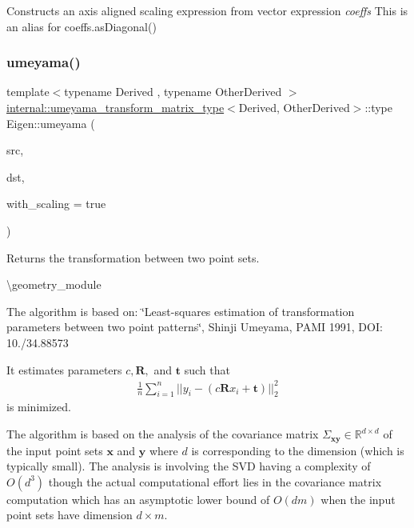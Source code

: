 Constructs an axis aligned scaling expression from vector expression {\itshape coeffs} This is an alias for coeffs.\+as\+Diagonal() \mbox{\label{group___geometry___module_gab3f5a82a24490b936f8694cf8fef8e60}} 
\subsubsection{\texorpdfstring{umeyama()}{umeyama()}}
{\footnotesize\ttfamily template$<$typename Derived , typename Other\+Derived $>$ \\
\mbox{\hyperlink{struct_eigen_1_1internal_1_1umeyama__transform__matrix__type}{internal\+::umeyama\+\_\+transform\+\_\+matrix\+\_\+type}}$<$Derived, Other\+Derived$>$\+::type Eigen\+::umeyama (\begin{DoxyParamCaption}\item[{const \mbox{\hyperlink{class_eigen_1_1_matrix_base}{Matrix\+Base}}$<$ Derived $>$ \&}]{src,  }\item[{const \mbox{\hyperlink{class_eigen_1_1_matrix_base}{Matrix\+Base}}$<$ Other\+Derived $>$ \&}]{dst,  }\item[{bool}]{with\+\_\+scaling = {\ttfamily true} }\end{DoxyParamCaption})}



Returns the transformation between two point sets. 

\textbackslash{}geometry\+\_\+module

The algorithm is based on\+: \char`\"{}\+Least-\/squares estimation of transformation parameters between two point patterns\char`\"{}, Shinji Umeyama, P\+A\+MI 1991, D\+OI\+: 10./34.88573

It estimates parameters $ c, \mathbf{R}, $ and $ \mathbf{t} $ such that \begin{align*} \frac{1}{n} \sum_{i=1}^n \vert\vert y_i - (c\mathbf{R}x_i + \mathbf{t}) \vert\vert_2^2 \end{align*} is minimized.

The algorithm is based on the analysis of the covariance matrix $ \Sigma_{\mathbf{x}\mathbf{y}} \in \mathbb{R}^{d \times d} $ of the input point sets $ \mathbf{x} $ and $ \mathbf{y} $ where $d$ is corresponding to the dimension (which is typically small). The analysis is involving the S\+VD having a complexity of $O(d^3)$ though the actual computational effort lies in the covariance matrix computation which has an asymptotic lower bound of $O(dm)$ when the input point sets have dimension $d \times m$.


